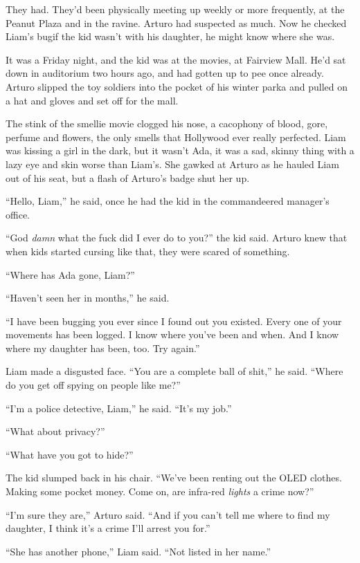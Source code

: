 They had. They’d been physically meeting up weekly or more
frequently, at the Peanut Plaza and in the ravine. Arturo had
suspected as much. Now he checked Liam’s bug{\dash}if the kid wasn’t with
his daughter, he might know where she was.

It was a Friday night, and the kid was at the movies, at Fairview
Mall. He’d sat down in auditorium two hours ago, and had gotten up
to pee once already. Arturo slipped the toy soldiers into the
pocket of his winter parka and pulled on a hat and gloves and set
off for the mall.

\tb

The stink of the smellie movie clogged his nose, a cacophony of
blood, gore, perfume and flowers, the only smells that Hollywood
ever really perfected. Liam was kissing a girl in the dark, but it
wasn’t Ada, it was a sad, skinny thing with a lazy eye and skin
worse than Liam’s. She gawked at Arturo as he hauled Liam out of
his seat, but a flash of Arturo’s badge shut her up.

“Hello, Liam,” he said, once he had the kid in the commandeered
manager’s office.

“God \emph{damn} what the fuck did I ever do to you?” the kid said.
Arturo knew that when kids started cursing like that, they were
scared of something.

“Where has Ada gone, Liam?”

“Haven’t seen her in months,” he said.

“I have been bugging you ever since I found out you existed. Every
one of your movements has been logged. I know where you’ve been and
when. And I know where my daughter has been, too. Try again.”

Liam made a disgusted face. “You are a complete ball of shit,” he
said. “Where do you get off spying on people like me?”

“I’m a police detective, Liam,” he said. “It’s my job.”

“What about privacy?”

“What have you got to hide?”

The kid slumped back in his chair. “We’ve been renting out the OLED
clothes. Making some pocket money. Come on, are infra-red
\emph{lights} a crime now?”

“I’m sure they are,” Arturo said. “And if you can’t tell me where
to find my daughter, I think it’s a crime I’ll arrest you for.”

“She has another phone,” Liam said. “Not listed in her name.”


